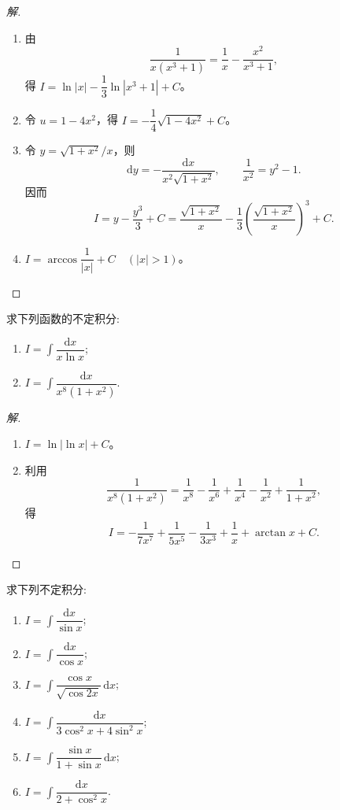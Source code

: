 \documentclass[../../数学分析培优讲义(答案版).tex]{subfiles}
\begin{document}
\begin{proof}[解]
\begin{enumerate}[label=(\arabic*)]
    \item 由
    \[
        \dfrac{1}{x(x^3+1)}=\dfrac{1}{x}-\dfrac{x^2}{x^3+1},
    \]
    得 $\displaystyle I=\ln|x|-\dfrac{1}{3}\ln|x^3+1|+C$。
    \item 令 $u=1-4x^2$，得 $\displaystyle I=-\dfrac{1}{4}\sqrt{1-4x^2}+C$。
    \item 令 $y=\sqrt{1+x^2}/x$，则
    \[
        \mathrm{d}y=-\dfrac{\mathrm{d}x}{x^2\sqrt{1+x^2}},
        \qquad
        \dfrac{1}{x^2}=y^2-1.
    \]
    因而
    \[
        I=y-\dfrac{y^3}{3}+C
        =\dfrac{\sqrt{1+x^2}}{x}
        -\dfrac{1}{3}\left(\dfrac{\sqrt{1+x^2}}{x}\right)^3+C.
    \]
    \item $\displaystyle I=\arccos\dfrac{1}{|x|}+C\quad(|x|>1)$。
\end{enumerate}
\end{proof}

\begin{example}
求下列函数的不定积分:
\begin{enumerate}[label=(\arabic*)]
    \item $\displaystyle I=\int\dfrac{\mathrm{d}x}{x\ln x}$;
    \item $\displaystyle I=\int\dfrac{\mathrm{d}x}{x^8(1+x^2)}$.
\end{enumerate}
\end{example}

\begin{proof}[解]
\begin{enumerate}[label=(\arabic*)]
    \item $\displaystyle I=\ln|\ln x|+C$。
    \item 利用
    \[
        \dfrac{1}{x^8(1+x^2)}
        =\dfrac{1}{x^8}-\dfrac{1}{x^6}+\dfrac{1}{x^4}-\dfrac{1}{x^2}+\dfrac{1}{1+x^2},
    \]
    得
    \[
        I=-\dfrac{1}{7x^7}+\dfrac{1}{5x^5}-\dfrac{1}{3x^3}
        +\dfrac{1}{x}+\arctan x+C.
    \]
\end{enumerate}
\end{proof}

\begin{example}
求下列不定积分:
\begin{enumerate}[label=(\arabic*)]
    \item $\displaystyle I=\int\dfrac{\mathrm{d}x}{\sin x}$;
    \item $\displaystyle I=\int\dfrac{\mathrm{d}x}{\cos x}$;
    \item $\displaystyle I=\int\dfrac{\cos x}{\sqrt{\cos2x}}\,\mathrm{d}x$;
    \item $\displaystyle I=\int\dfrac{\mathrm{d}x}{3\cos^2x+4\sin^2x}$;
    \item $\displaystyle I=\int\dfrac{\sin x}{1+\sin x}\,\mathrm{d}x$;
    \item $\displaystyle I=\int\dfrac{\mathrm{d}x}{2+\cos^2x}$.
\end{enumerate}
\end{example}
\end{document}
